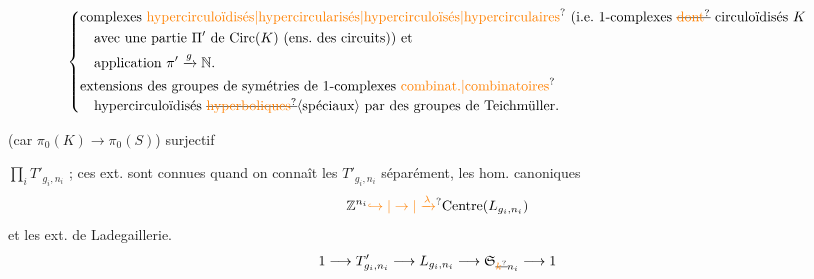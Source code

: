 
\[\left\{\begin{aligned}
 &\text{complexes \unsure{hypercirculoïdisés|hypercircularisés|hypercirculoïsés|hypercirculaires} (i.e.\ 1-complexes \deleted{\unsure{dont}} circuloïdisés \(K\)}\\
 &\quad\text{avec une partie \(\Pi'\) de \(\mathrm{Circ}(K)\) (ens.\ des circuits)) et}\\
 &\quad\text{application \(\pi'\xrightarrow{g}\mathbb{N}\).}\\
 &\text{extensions des groupes de symétries de 1-complexes \unsure{combinat.|combinatoires}}\\[-2pt]
 &\quad\text{hypercirculoïdisés \deleted{\unsure{hyperboliques}}\inserted{spéciaux} par des groupes de Teichmüller.}
\end{aligned}\right.\]

(car \(\pi_0(K)\to\pi_0(S)\)) surjectif 

\(\prod_i T'_{g_i,n_i}\) ; ces ext. sont connues quand on connaît les \(T'_{g_i,n_i}\) séparément,  les hom. canoniques
\[
 \mathbb{Z}^{n_i}\unsure{\lhook\joinrel\to|\to|\xrightarrow{\lambda}}\mathrm{Centre}(L_{g_i,n_i})
\]
et les ext. de Ladegaillerie.
\[
 1\longrightarrow T'_{g_i,n_i}\longrightarrow L_{g_i,n_i}
 \longrightarrow\mathfrak{S}_{\deleted{\unsure{k}}n_i}\longrightarrow1
\]

